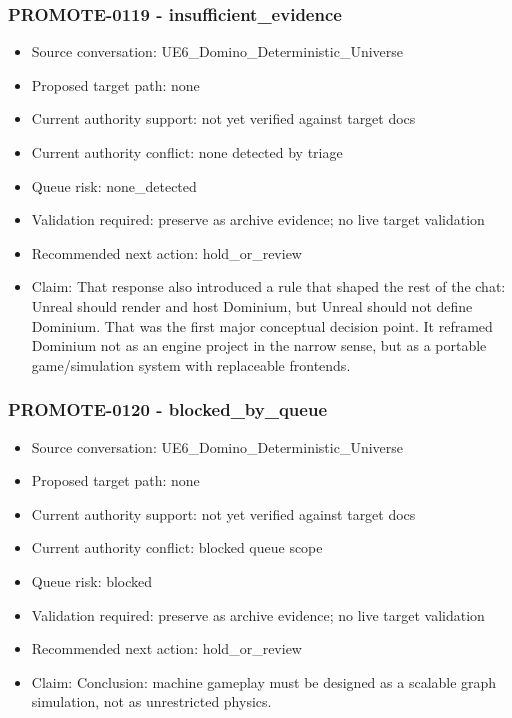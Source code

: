\documentclass[11pt,a4paper]{report}
\begin{document}
\subsubsection{PROMOTE-0119 - insufficient\_evidence}

\begin{itemize}
\item Source conversation: UE6\_Domino\_Deterministic\_Universe
\item Proposed target path: none
\item Current authority support: not yet verified against target docs
\item Current authority conflict: none detected by triage
\item Queue risk: none\_detected
\item Validation required: preserve as archive evidence; no live target validation
\item Recommended next action: hold\_or\_review
\item Claim: That response also introduced a rule that shaped the rest of the chat: Unreal should render and host Dominium, but Unreal should not define Dominium. That was the first major conceptual decision point. It reframed Dominium not as an engine project in the narrow sense, but as a portable game/simulation system with replaceable frontends.
\end{itemize}

\subsubsection{PROMOTE-0120 - blocked\_by\_queue}

\begin{itemize}
\item Source conversation: UE6\_Domino\_Deterministic\_Universe
\item Proposed target path: none
\item Current authority support: not yet verified against target docs
\item Current authority conflict: blocked queue scope
\item Queue risk: blocked
\item Validation required: preserve as archive evidence; no live target validation
\item Recommended next action: hold\_or\_review
\item Claim: Conclusion: machine gameplay must be designed as a scalable graph simulation, not as unrestricted physics.
\end{itemize}
\end{document}

